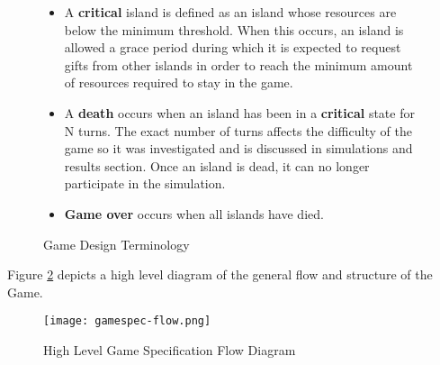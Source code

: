 \begin{figure}[!htb]
\begin{itemize}
        \item A \textbf{critical} island is defined as an island whose resources are below the minimum threshold. When this occurs, an island is allowed a grace period during which it is expected to request gifts from other islands in order to reach the minimum amount of resources required to stay in the game.
        \item A \textbf{death} occurs when an island has been in a \textbf{critical} state for N turns. The exact number of turns affects the difficulty of the game so it was investigated and is discussed in simulations and results section. Once an island is dead, it can no longer participate in the simulation. 
        \item \textbf{Game over} occurs when all islands have died. 
    \end{itemize}
    \caption{Game Design Terminology}
    \label{fig:gamedesign-terminology}
\end{figure}

Figure \ref{fig:gamedesign-flow} depicts a high level diagram of the general flow and structure of the Game. 

\begin{figure}[!htb]
    \centering
    \texttt{[image: gamespec-flow.png]}
    \caption{High Level Game Specification Flow Diagram}
    \label{fig:gamedesign-flow}
\end{figure}



